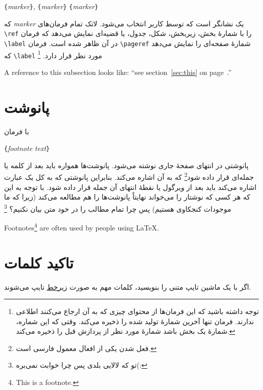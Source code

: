 \begin{lscommand}
\verb|{|\emph{marker}\verb|}|, \verb|{|\emph{marker}\verb|}| 
 \verb|{|\emph{marker}\verb|}|
\end{lscommand}

\noindent 
که 
\emph{marker}
یک نشانگر است که توسط کاربر انتخاب می‌شود. لاتک تمام فرمان‌های 
\verb|\ref|
را با شمارهٔ بخش، زیربخش، شکل، جدول، یا قضیه‌ای نمایش می‌دهد که فرمان 
\verb|\label|
در آن ظاهر شده است. فرمان 
\verb|\pageref|
شمارهٔ صفحه‌ای را نمایش می‌دهد که 
\verb|\label|
مورد نظر قرار دارد.%
\footnote{توجه داشته باشید که این فرمان‌ها از محتوای چیزی که به آن ارجاع می‌کنند اطلاعی ندارند. فرمان تنها آخرین شمارهٔ تولید شده را ذخیره می‌کند. وقتی که این شماره، شمارهٔ یک بخش باشد شمارهٔ مورد نظر از پردازش قبل را ذخیره می‌کند.}

\begin{example}
A reference to this subsection
\label{sec:this} looks like:
``see section~\ref{sec:this} on 
page~\pageref{sec:this}.''
\end{example}
\section{پانوشت}
با فرمان 

\begin{lscommand}
\verb|{|\emph{footnote text}\verb|}|
\end{lscommand}

\noindent 
پانوشتی در انتهای صفحهٔ جاری نوشته می‌شود. پانوشت‌ها همواره باید بعد از کلمه یا جمله‌ای قرار داده شود\footnote{فعل شدن یکی از افعال معمول فارسی است.}
 که به آن اشاره می‌کند. بنابراین پانوشتی که به کل یک عبارت اشاره می‌کند باید بعد از ویرگول یا نقطهٔ انتهای آن جمله قرار داده شود. با توجه به این که هر کسی که نوشتار را می‌خواند نهایتاً پانوشت‌ها را هم مطالعه می‌کند (زیرا که ما موجودات کنجکاوی هستیم) پس چرا تمام مطالب را در خود متن بیان نکنیم؟%
\footnote{تو که لالایی بلدی پس چرا خوابت نمی‌بره(\lr{-}:}


\begin{latin}
\begin{example}
Footnotes\footnote{This is 
  a footnote.} are often used 
by people using \LaTeX.
\end{example}
\end{latin}


\section{تاکید کلمات}
اگر با یک ماشین تایپ متنی را بنویسید، کلمات مهم به صورت 
\underline{زیرخط}
تایپ می‌شوند. 

